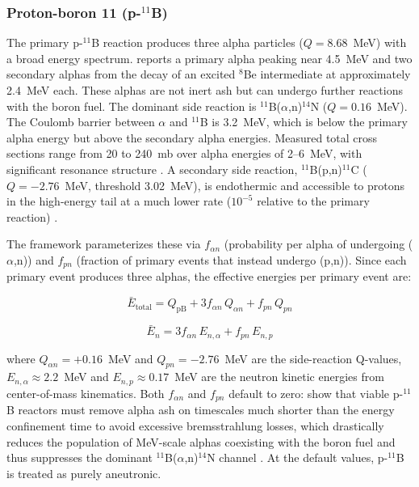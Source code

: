 \documentclass{article}
\begin{document}
\subsubsection{\texorpdfstring{Proton-boron 11 (p-${}^{11}$B)}{Proton-boron 11 (p-11B)}}
The primary p-${}^{11}$B reaction produces three alpha particles
($Q = 8.68$~MeV) with a broad energy spectrum. \citet{dmitriev2009} reports
a primary alpha peaking near 4.5~MeV and two secondary alphas from the
decay of an excited ${}^8$Be intermediate at approximately 2.4~MeV each. These alphas
are not inert ash but can undergo further reactions with the boron fuel.
The dominant side reaction is ${}^{11}$B($\alpha$,n)${}^{14}$N ($Q = 0.16$~MeV).
The Coulomb barrier between $\alpha$ and ${}^{11}$B is 3.2~MeV, which is
below the primary alpha energy but above the secondary alpha energies.
Measured total cross sections range from 20 to 240~mb
over alpha energies of 2--6~MeV, with significant resonance structure
\citep{prior2017}. A secondary side reaction,
${}^{11}$B(p,n)${}^{11}$C ($Q = -2.76$~MeV, threshold 3.02~MeV),
is endothermic and accessible to protons in the high-energy tail at a much lower rate
($10^{-5}$ relative to the primary reaction)
\citep{putvinski2019}.

The framework parameterizes these via $f_{\alpha n}$ (probability per
alpha of undergoing ($\alpha$,n)) and $f_{pn}$ (fraction of primary
events that instead undergo (p,n)). Since each primary event produces
three alphas, the effective energies per primary event are:

\begin{equation}
\label{eq:pb11-etotal}
\bar{E}_{\text{total}} = Q_{\text{pB}} + 3 f_{\alpha n} \, Q_{\alpha n}
  + f_{pn} \, Q_{pn}
\end{equation}

\begin{equation}
\label{eq:pb11-eneutron}
\bar{E}_n = 3 f_{\alpha n} \, E_{n,\alpha} + f_{pn} \, E_{n,p}
\end{equation}

\noindent where $Q_{\alpha n} = +0.16$~MeV and $Q_{pn} = -2.76$~MeV
are the side-reaction Q-values, $E_{n,\alpha} \approx 2.2$~MeV and
$E_{n,p} \approx 0.17$~MeV are the neutron kinetic energies from
center-of-mass kinematics.
Both $f_{\alpha n}$ and $f_{pn}$ default to zero:
\citet{ochs2025} show that viable p-${}^{11}$B reactors must remove
alpha ash on timescales much shorter than the energy confinement time
to avoid excessive bremsstrahlung losses, which drastically reduces the
population of MeV-scale alphas coexisting with the boron fuel and thus
suppresses the dominant ${}^{11}$B($\alpha$,n)${}^{14}$N channel
\citep{hora2021}. At the default values, p-${}^{11}$B is treated as
purely aneutronic.
\end{document}

